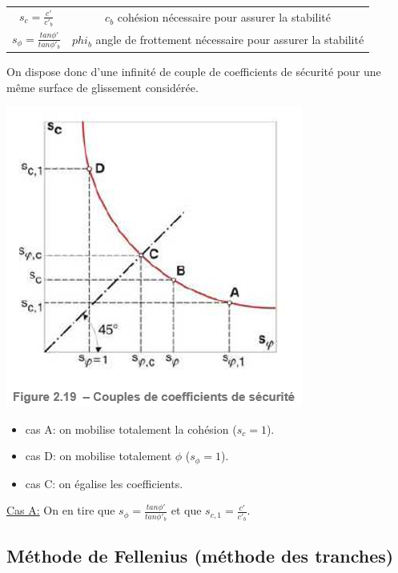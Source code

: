 \begin{center}
\begin{tabular}{c|c}
$s_c = \frac{c'}{c'_b}$
                & $c_b$ cohésion nécessaire pour assurer la stabilité  \\
$s_{\phi} = \frac{tan \phi'}{tan \phi'_b}$
                & $phi_b$ angle de frottement nécessaire pour assurer la stabilité 
\end{tabular}
\end{center}

On dispose donc d'une infinité de couple de coefficients de sécurité pour une même surface de glissement considérée.

\begin{center}
\includegraphics [scale=0.5]{pictures/csa.PNG}
\end{center}

\begin{itemize}
    \item cas A: on mobilise totalement la cohésion ($s_c = 1$).
    \item cas D: on mobilise totalement $\phi$ ($s_{\phi} = 1$).
    \item cas C: on égalise les coefficients.
\end{itemize}

\medskip

\underline{Cas A:} 
On en tire que $s_{\phi} = \frac{tan \phi'}{tan \phi'_b}$ et que $s_{c,1}=\frac{c'}{c'_b}$.

\subsection{Méthode de Fellenius (méthode des tranches)}

